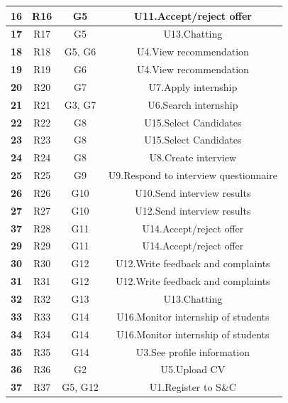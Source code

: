 \begin{longtable}{|c|c|c|c|}
        \hline
        \textbf{16} & R16 & G5 & U11.Accept/reject offer  \T\B \\
        \hline
        \textbf{17} & R17 & G5 & U13.Chatting  \T\B \\
        \hline
        \textbf{18} & R18 & G5, G6 & U4.View recommendation  \T\B \\
        \hline
        \textbf{19} & R19 & G6 & U4.View recommendation  \T\B \\
        \hline
        \textbf{20} & R20 & G7 & U7.Apply internship  \T\B \\
        \hline
        \textbf{21} & R21 & G3, G7 & U6.Search internship \T\B \\
        \hline
        \textbf{22} & R22 & G8 & U15.Select Candidates  \T\B \\
        \hline
        \textbf{23} & R23 & G8 & U15.Select Candidates  \T\B \\
        \hline
        \textbf{24} & R24 & G8 & U8.Create interview\T\B \\
        \hline
        \textbf{25} & R25 & G9 & U9.Respond to interview questionnaire \T\B \\
        \hline
        \textbf{26} & R26 & G10 & U10.Send interview results  \T\B \\
        \hline
        \textbf{27} & R27 & G10 & U12.Send interview results  \T\B \\
        \hline
        \textbf{37} & R28 & G11 & U14.Accept/reject offer  \T\B \\
        \hline
        \textbf{29} & R29 & G11 & U14.Accept/reject offer \T\B \\
        \hline
        \textbf{30} & R30 & G12 & U12.Write feedback and complaints  \T\B \\
        \hline
        \textbf{31} & R31 & G12 & U12.Write feedback and complaints \T\B \\
        \hline
        \textbf{32} & R32 & G13 & U13.Chatting  \T\B \\
        \hline
        \textbf{33} & R33 & G14 & U16.Monitor internship of students  \T\B \\
        \hline
        \textbf{34} & R34 & G14 & U16.Monitor internship of students  \T\B \\
        \hline
        \textbf{35} & R35 & G14 & U3.See profile information  \T\B \\
        \hline
        \textbf{36} & R36 & G2 & U5.Upload CV \T\B \\
        \hline
        \textbf{37} & R37 & G5, G12 & U1.Register to S\&C  \T\B \\
        \hline
    \end{longtable}


